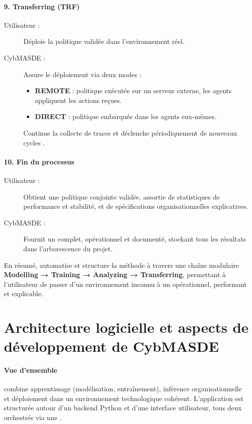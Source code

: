 \paragraph{9. Transferring (TRF)}
\begin{description}
  \item[Utilisateur :] Déploie la politique validée dans l'environnement réel.
  \item[CybMASDE :] Assure le déploiement via deux modes :
    \begin{itemize}
      \item \textbf{REMOTE} : politique exécutée sur un serveur externe, les agents appliquent les actions reçues.
      \item \textbf{DIRECT} : politique embarquée dans les agents eux-mêmes.
    \end{itemize}
    Continue la collecte de traces et déclenche périodiquement de nouveaux cycles .
\end{description}

\paragraph{10. Fin du processus}
\begin{description}
  \item[Utilisateur :] Obtient une politique conjointe validée, assortie de statistiques de performance et stabilité, et de spécifications organisationnelles explicatives.
  \item[CybMASDE :] Fournit un  complet, opérationnel et documenté, stockant tous les résultats dans l'arborescence du projet.
\end{description}

\medskip
En résumé,  automatise et structure la méthode  à travers une chaîne modulaire \textbf{Modelling → Training → Analyzing → Transferring}, permettant à l'utilisateur de passer d'un environnement inconnu à un  opérationnel, performant et explicable.

\section*{Architecture logicielle et aspects de développement de CybMASDE}

\paragraph{Vue d'ensemble}
 combine apprentissage (modélisation, entraînement), inférence organisationnelle et déploiement dans un environnement technologique cohérent. L'application est structurée autour d'un backend Python et d'une interface utilisateur, tous deux orchestrés via une  .

